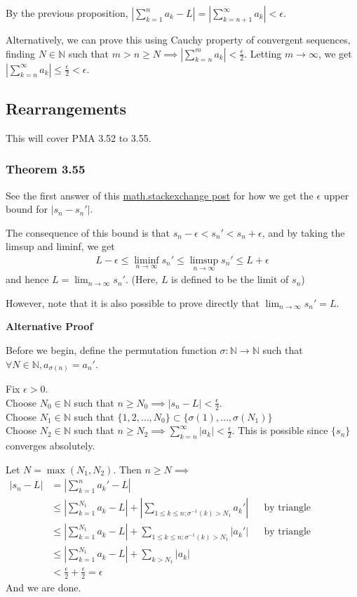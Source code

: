 \documentclass{article}
\begin{document}
By the previous proposition, $|\sum_{k=1}^{n}a_k - L|=|\sum_{k=n+1}^\infty a_k|<\epsilon$.


Alternatively, we can prove this using Cauchy property of convergent sequences, finding $N\in \mathbb{N}$ such that $m>n\geq N\implies |\sum_{k=n}^ma_k|<\frac{\epsilon}{2}$. Letting $m\rightarrow \infty$, we get $|\sum_{k=n}^\infty a_k|\leq \frac{\epsilon}{2} < \epsilon$.


\subsection{Rearrangements}
This will cover PMA 3.52 to 3.55.

\subsubsection{Theorem 3.55}
See the first answer of this \href{https://math.stackexchange.com/questions/523979/theorem-3-55-rudin-rearrangement-and-convergence}{math.stackexchange post} for how we get the $\epsilon$ upper bound for $|s_n-s_n'|$.

The consequence of this bound is that $s_n - \epsilon <s_n'<s_n + \epsilon$, and by taking the limsup and liminf, we get
\begin{align*}
	L - \epsilon \leq \liminf_{n\rightarrow \infty}s_n'\leq \limsup_{n\rightarrow \infty}s_n' \leq L + \epsilon
\end{align*}
and hence $L = \lim_{n\rightarrow \infty}s_n'$. (Here, $L$ is defined to be the limit of $s_n$)

However, note that it is also possible to prove directly that $\lim_{n\rightarrow \infty} s_n' = L$.

\textbf{Alternative Proof}

Before we begin, define the permutation function $\sigma: \mathbb{N}\rightarrow \mathbb{N}$ such that $\forall N\in \mathbb{N}, a_{\sigma(n)}=a_n'$.

Fix $\epsilon > 0$. \\
Choose $N_0\in \mathbb{N}$ such that $n\geq N_0\implies |s_n - L| < \frac{\epsilon}{2}$.\\
Choose $N_1\in \mathbb{N}$ such that $\{1, 2, \dots, N_0\}\subset \{\sigma(1),\dots, \sigma(N_1)\}$\\
Choose $N_2\in \mathbb{N}$ such that $n\geq N_2\implies \sum_{k=n}^\infty |a_k|<\frac{\epsilon}{2}$. This is possible since $\{s_n\}$ converges absolutely.

Let $N=\max(N_1, N_2)$. Then $n\geq N\implies$
\begin{align*}
	|s_n - L| &= |\sum_{k=1}^n a_k' - L|\\
	&\leq |\sum_{k=1}^{N_1} a_k - L| + |\sum_{1\leq k\leq n; \sigma^{-1}(k) > N_1}a_k'| &&\text{by triangle inequality} \\
	&\leq |\sum_{k=1}^{N_1} a_k - L| + \sum_{1\leq k\leq n; \sigma^{-1}(k) > N_1}|a_k'| &&\text{by triangle inequality} \\
	&\leq |\sum_{k=1}^{N_1} a_k - L| + \sum_{k > N_1}|a_k|\\
	&< \frac{\epsilon}{2} + \frac{\epsilon}{2} = \epsilon
\end{align*}
And we are done.
\end{document}
